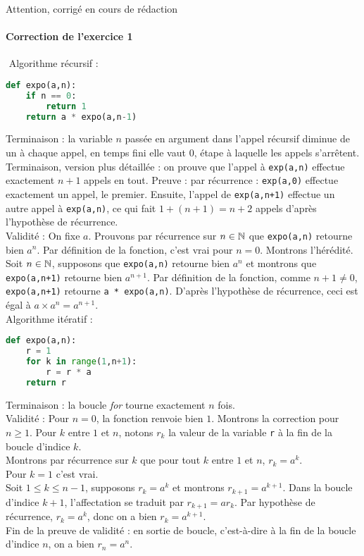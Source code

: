 \documentclass[11pt,a4paper]{article}
\begin{document}
\newpage

{\Huge Attention, corrigé en cours de rédaction}

\paragraph{Correction de l'exercice 1 }$ $
Algorithme récursif : 
\begin{lstlisting}[language=Python]
def expo(a,n):
	if n == 0:
		return 1
	return a * expo(a,n-1)
\end{lstlisting}
Terminaison : la variable $n$ passée en argument dans l'appel récursif diminue de un à chaque appel, en temps fini elle vaut $0$, étape à laquelle les appels s'arrêtent.\\
Terminaison, version plus détaillée : on prouve que l'appel à \verb+exp(a,n)+ effectue exactement $n+1$ appels en tout. Preuve : par récurrence : \verb+exp(a,0)+ effectue exactement un appel, le premier.  Ensuite, l'appel de \verb|exp(a,n+1)| effectue un autre appel à \verb+exp(a,n)+, ce qui fait $1+(n+1) = n+2$ appels d'après l'hypothèse de récurrence. \\
Validité : On fixe $a$. Prouvons par récurrence sur $n \in \mathbb{N}$ que \verb+expo(a,n)+ retourne bien $a^n$. Par définition de la fonction, c'est vrai pour $n=0$. Montrons l'hérédité. Soit $n\in\mathbb{N}$, supposons que \verb+expo(a,n)+ retourne bien $a^n$ et montrons que  \verb|expo(a,n+1)| retourne bien $a^{n+1}$. Par définition de la fonction, comme $n+1 \neq 0$, \verb|expo(a,n+1)|  retourne \verb+a * expo(a,n)+. D'après l'hypothèse de récurrence,  ceci est égal à  $a\times a^n = a^{n+1}$.\\

Algorithme itératif :

\begin{lstlisting}[language=Python]
def expo(a,n):
	r = 1
	for k in range(1,n+1):
		r = r * a
	return r
\end{lstlisting}
Terminaison : la boucle \textit{for} tourne exactement $n$ fois.\\
Validité : Pour $n=0$, la fonction renvoie bien $1$. Montrons la correction pour $n\geq 1$. Pour $k$ entre $1$ et $n$, notons $r_k$ la valeur de la variable \verb+r+ à la fin de la boucle d'indice $k$.\\
Montrons par récurrence sur $k$ que pour tout $k$ entre $1$ et $n$, $r_k = a^k$.\\
Pour $k=1$ c'est vrai.\\
Soit $1\leq k \leq n-1$, supposons $r_k = a^k$ et montrons $r_{k+1} = a^{k+1}$. Dans la boucle d'indice $k+1$, l'affectation se traduit par $r_{k+1} = ar_k$. Par hypothèse de récurrence, $r_k=a^k$, donc on a bien $r_k=a^{k+1}$.\\
Fin de la preuve de validité : en sortie de boucle, c'est-à-dire à la fin de la boucle d'indice $n$, on a bien $r_n = a^n$.
\end{document}
